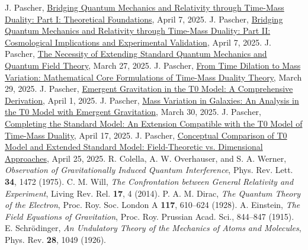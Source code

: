 \documentclass[12pt,a4paper]{article}
\begin{document}
	
	\begin{thebibliography}{99}
		 J. Pascher, \href{https://github.com/jpascher/T0-Time-Mass-Duality/tree/main/2/pdf/English/QMRelTimeMassPart1En.pdf}{Bridging Quantum Mechanics and Relativity through Time-Mass Duality: Part I: Theoretical Foundations}, April 7, 2025.
		 J. Pascher, \href{https://github.com/jpascher/T0-Time-Mass-Duality/tree/main/2/pdf/English/QMRelTimeMassPart2En.pdf}{Bridging Quantum Mechanics and Relativity through Time-Mass Duality: Part II: Cosmological Implications and Experimental Validation}, April 7, 2025.
		 J. Pascher, \href{https://github.com/jpascher/T0-Time-Mass-Duality/tree/main/2/pdf/English/NotwendigkeitQMErweiterungEn.pdf}{The Necessity of Extending Standard Quantum Mechanics and Quantum Field Theory}, March 27, 2025.
		 J. Pascher, \href{https://github.com/jpascher/T0-Time-Mass-Duality/tree/main/2/pdf/English/MathZeitMasseLagrangeEn.pdf}{From Time Dilation to Mass Variation: Mathematical Core Formulations of Time-Mass Duality Theory}, March 29, 2025.
		 J. Pascher, \href{https://github.com/jpascher/T0-Time-Mass-Duality/tree/main/2/pdf/English/EmergentGravT0En.pdf}{Emergent Gravitation in the T0 Model: A Comprehensive Derivation}, April 1, 2025.
		 J. Pascher, \href{https://github.com/jpascher/T0-Time-Mass-Duality/tree/main/2/pdf/English/MassVarGalaxienEn.pdf}{Mass Variation in Galaxies: An Analysis in the T0 Model with Emergent Gravitation}, March 30, 2025.
		 J. Pascher, \href{https://github.com/jpascher/T0-Time-Mass-Duality/tree/main/2/pdf/English/StandardModKruemmungRotvEn.pdf}{Completing the Standard Model: An Extension Compatible with the T0 Model of Time-Mass Duality}, April 17, 2025.
		 J. Pascher, \href{https://github.com/jpascher/T0-Time-Mass-Duality/tree/main/2/pdf/English/T0vsESM_ConceptualAnalysisEn.pdf}{Conceptual Comparison of T0 Model and Extended Standard Model: Field-Theoretic vs. Dimensional Approaches}, April 25, 2025.
		 R. Colella, A. W. Overhauser, and S. A. Werner, \textit{Observation of Gravitationally Induced Quantum Interference}, Phys. Rev. Lett. \textbf{34}, 1472 (1975).
		 C. M. Will, \textit{The Confrontation between General Relativity and Experiment}, Living Rev. Rel. \textbf{17}, 4 (2014).
		 P. A. M. Dirac, \textit{The Quantum Theory of the Electron}, Proc. Roy. Soc. London A \textbf{117}, 610--624 (1928).
		 A. Einstein, \textit{The Field Equations of Gravitation}, Proc. Roy. Prussian Acad. Sci., 844--847 (1915).
		 E. Schrödinger, \textit{An Undulatory Theory of the Mechanics of Atoms and Molecules}, Phys. Rev. \textbf{28}, 1049 (1926).
	\end{thebibliography}
	
\end{document}
